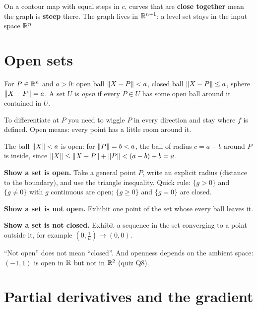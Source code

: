 \begin{remember}
On a contour map with equal steps in $c$, curves that are \textbf{close together} mean
the graph is \textbf{steep} there. The graph lives in $\mathbb{R}^{n+1}$; a level set stays in the
input space $\mathbb{R}^n$.
\end{remember}

\section{Open sets}

\begin{defi}
For $P\in\mathbb{R}^n$ and $a>0$: open ball $\left\lVert X-P\right\rVert<a$, closed ball $\left\lVert X-P\right\rVert\le a$, sphere
$\left\lVert X-P\right\rVert=a$. A set $U$ is \emph{open} if every $P\in U$ has some open ball around it
contained in $U$.
\end{defi}

\begin{intuition}
To differentiate at $P$ you need to wiggle $P$ in every direction and stay where $f$ is
defined. Open means: every point has a little room around it.
\end{intuition}

\begin{thm}
The ball $\left\lVert X\right\rVert<a$ is open: for $\left\lVert P\right\rVert=b<a$, the ball of radius $c=a-b$ around $P$ is
inside, since $\left\lVert X\right\rVert\le\left\lVert X-P\right\rVert+\left\lVert P\right\rVert<(a-b)+b=a$.
\end{thm}

\begin{method}
\textbf{Show a set is open.} Take a general point $P$, write an explicit radius (distance
to the boundary), and use the triangle inequality. Quick rule: $\{g>0\}$ and $\{g\ne 0\}$
with $g$ continuous are open; $\{g\ge 0\}$ and $\{g=0\}$ are closed.

\textbf{Show a set is not open.} Exhibit one point of the set whose every ball leaves it.

\textbf{Show a set is not closed.} Exhibit a sequence in the set converging to a point
outside it, for example $(0,\tfrac1n)\to(0,0)$.
\end{method}

\begin{trap}
``Not open'' does not mean ``closed''. And openness depends on the ambient space: $(-1,1)$
is open in $\mathbb{R}$ but not in $\mathbb{R}^2$ (quiz Q8).
\end{trap}

\section{Partial derivatives and the gradient}

